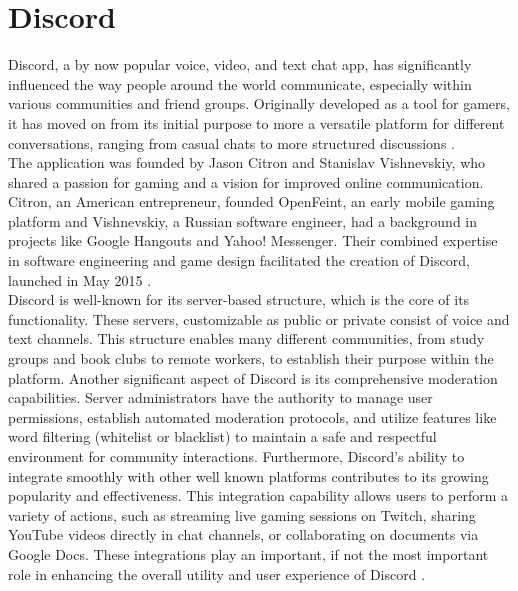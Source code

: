 \section{Discord}
\label{sec:Discord}

Discord, a by now popular voice, video, and text chat app, has significantly influenced the way people around the world communicate, especially within various communities and friend groups. Originally developed as a tool for gamers, it has moved on from its initial purpose to more a versatile platform for different conversations, ranging from casual chats to more structured discussions \citep{whatisdiscord}.\\

The application was founded by Jason Citron and Stanislav Vishnevskiy, who shared a passion for gaming and a vision for improved online communication. Citron, an American entrepreneur, founded OpenFeint, an early mobile gaming platform and Vishnevskiy, a Russian software engineer, had a background in projects like Google Hangouts and Yahoo! Messenger. Their combined expertise in software engineering and game design facilitated the creation of Discord, launched in May 2015 \citep{DiscordInventors}.\\

Discord is well-known for its server-based structure, which is the core of its functionality. These servers, customizable as public or private consist of voice and text channels. This structure enables many different communities, from study groups and book clubs to remote workers, to establish their purpose within the platform. Another significant aspect of Discord is its comprehensive moderation capabilities. Server administrators have the authority to manage user permissions, establish automated moderation protocols, and utilize features like word filtering (whitelist or blacklist) to maintain a safe and respectful environment for community interactions. Furthermore, Discord's ability to integrate smoothly with other well known platforms contributes to its growing popularity and effectiveness. This integration capability allows users to perform a variety of actions, such as streaming live gaming sessions on Twitch, sharing YouTube videos directly in chat channels, or collaborating on documents via Google Docs. These integrations play an important, if not the most important role in enhancing the overall utility and user experience of Discord \citep{GameInfoHubDiscordRevolution}.\\

